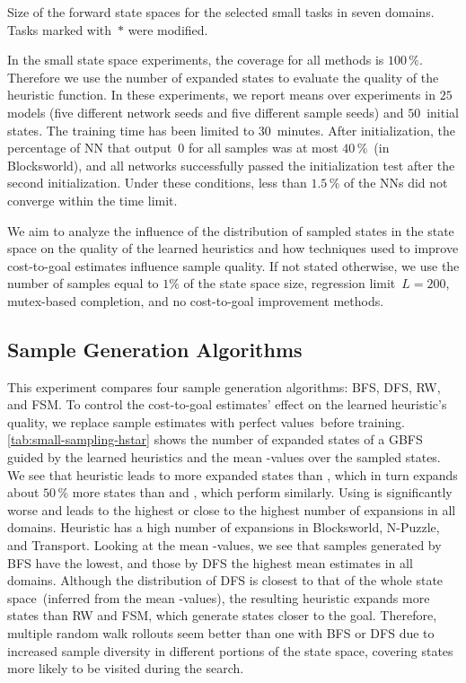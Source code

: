 \begin{table}[tb]
    \caption[Size of the forward state spaces for the selected domains.]{Size of the forward state spaces for the selected small tasks in seven domains. Tasks marked with~$*$ were modified.} 
    \label{tab:small-fss-size}
    \addmargin
    \centering
    
\end{table}

In the small state space experiments, the coverage for all methods is $100\,\%$. Therefore we use the number of expanded states to evaluate the quality of the heuristic function. In these experiments, we report means over experiments in $25$ models (five different network seeds and five different sample seeds) and $50$~initial states. The training time has been limited to $30$~minutes. After initialization, the percentage of NN that output~$0$ for all samples was at most $40\,\%$~(in Blocksworld), and all networks successfully passed the initialization test after the second initialization. Under these conditions, less than $1.5\,\%$ of the NNs did not converge within the time limit.

We aim to analyze the influence of the distribution of sampled states in the state space on the quality of the learned heuristics and how techniques used to improve cost-to-goal estimates influence sample quality. If not stated otherwise, we use the number of samples equal to $1\%$ of the state space size, regression limit~$L=200$, mutex-based completion, and no cost-to-goal improvement methods.

\subsection{Sample Generation Algorithms}
\label{sec:small-exps-algorithm}

This experiment compares four sample generation algorithms: BFS, DFS, RW, and FSM. To control the cost-to-goal estimates' effect on the learned heuristic's quality, we replace sample estimates with perfect values~\hstar before training. \cref{tab:small-sampling-hstar} shows the number of expanded states of a GBFS guided by the learned heuristics and the mean \hstar-values over the sampled states. We see that heuristic \hnnl{\bfs} leads to more expanded states than \hnnl{\dfs}, which in turn expands about $50\,\%$ more states than \hnnl{\rw} and \hnnl{\bfsrw}, which perform similarly. Using \hnnl{\bfs} is significantly worse and leads to the highest or close to the highest number of expansions in all domains. Heuristic \hnnl{\dfs} has a high number of expansions in Blocksworld, N-Puzzle, and Transport. Looking at the mean \hstar-values, we see that samples generated by BFS have the lowest, and those by DFS the highest mean estimates in all domains. Although the distribution of DFS is closest to that of the whole state space~(inferred from the mean \hstar-values), the resulting heuristic expands more states than RW and FSM, which generate states closer to the goal. Therefore, multiple random walk rollouts seem better than one with BFS or DFS due to increased sample diversity in different portions of the state space, covering states more likely to be visited during the search.

